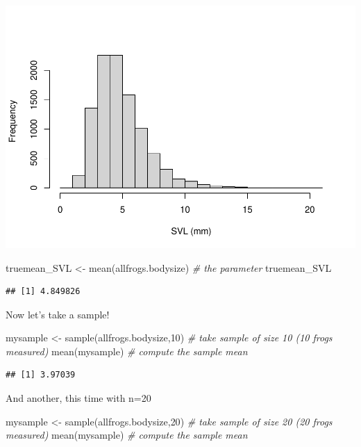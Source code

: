\documentclass[
]{article}
\newenvironment{Shaded}{\begin{snugshade}}{\end{snugshade}}
\newcommand{\CommentTok}[1]{\textcolor[rgb]{0.56,0.35,0.01}{\textit{#1}}}
\newcommand{\DecValTok}[1]{\textcolor[rgb]{0.00,0.00,0.81}{#1}}
\newcommand{\FunctionTok}[1]{\textcolor[rgb]{0.00,0.00,0.00}{#1}}
\newcommand{\NormalTok}[1]{#1}
\newcommand{\OtherTok}[1]{\textcolor[rgb]{0.56,0.35,0.01}{#1}}
\begin{document}
\includegraphics{LECTURE2_files/figure-latex/unnamed-chunk-3-1.pdf}

\begin{Shaded}
\begin{Highlighting}[]
\NormalTok{truemean\_SVL }\OtherTok{\textless{}{-}} \FunctionTok{mean}\NormalTok{(allfrogs.bodysize)           }\CommentTok{\# the \textquotesingle{}parameter\textquotesingle{}}
\NormalTok{truemean\_SVL }
\end{Highlighting}
\end{Shaded}

\begin{verbatim}
## [1] 4.849826
\end{verbatim}

Now let's take a sample!

\begin{Shaded}
\begin{Highlighting}[]
\NormalTok{mysample }\OtherTok{\textless{}{-}} \FunctionTok{sample}\NormalTok{(allfrogs.bodysize,}\DecValTok{10}\NormalTok{)    }\CommentTok{\# take sample of size 10 (10 frogs measured)}
\FunctionTok{mean}\NormalTok{(mysample)   }\CommentTok{\# compute the sample mean}
\end{Highlighting}
\end{Shaded}

\begin{verbatim}
## [1] 3.97039
\end{verbatim}

And another, this time with n=20

\begin{Shaded}
\begin{Highlighting}[]
\NormalTok{mysample }\OtherTok{\textless{}{-}} \FunctionTok{sample}\NormalTok{(allfrogs.bodysize,}\DecValTok{20}\NormalTok{)    }\CommentTok{\# take sample of size 20 (20 frogs measured)}
\FunctionTok{mean}\NormalTok{(mysample)   }\CommentTok{\# compute the sample mean}
\end{Highlighting}
\end{Shaded}
\end{document}

